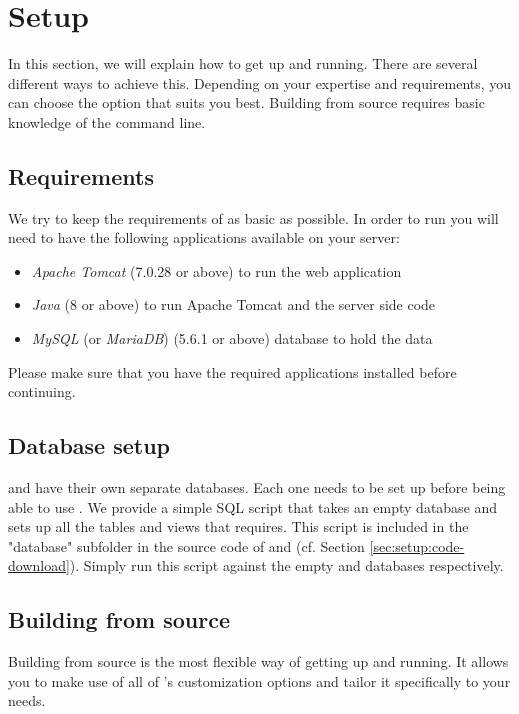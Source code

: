 \section{Setup}
In this section, we will explain how to get {\germinate} up and running. There are several different ways to achieve this. Depending on your expertise and requirements, you can choose the option that suits you best. Building from source requires basic knowledge of the command line.

\subsection{Requirements}
We try to keep the requirements of {\germinate} as basic as possible. In order to run {\germinate} you will need to have the following applications available on your server:

\begin{itemize}
	\item \textit{Apache Tomcat} (7.0.28 or above) to run the web application
	\item \textit{Java} (8 or above) to run Apache Tomcat and the {\germinate} server side code
	\item \textit{MySQL} (or \textit{MariaDB}) (5.6.1 or above) database to hold the data
\end{itemize}
\noindent
Please make sure that you have the required applications installed before continuing.

\subsection{Database setup}
\label{sec:setup:database}
{\germinate} and {\gatekeeper} have their own separate databases. Each one needs to be set up before being able to use {\germinate}. We provide a simple SQL script that takes an empty database and sets up all the tables and views that {\germinate} requires. This script is included in the "database" subfolder in the source code of {\germinate} and {\gatekeeper} (cf. Section \ref{sec:setup:code-download}). Simply run this script against the empty {\germinate} and {\gatekeeper} databases respectively.

\subsection{Building {\germinate} from source}
\label{sec:setup:build}
Building {\germinate} from source is the most flexible way of getting {\germinate} up and running. It allows you to make use of all of {\germinate}'s customization options and tailor it specifically to your needs.

